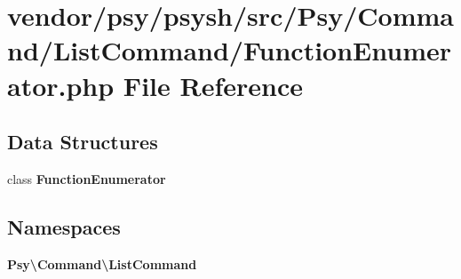 \section{vendor/psy/psysh/src/\+Psy/\+Command/\+List\+Command/\+Function\+Enumerator.php File Reference}
\label{_function_enumerator_8php}
\subsection*{Data Structures}
\begin{DoxyCompactItemize}
\item 
class {\bf Function\+Enumerator}
\end{DoxyCompactItemize}
\subsection*{Namespaces}
\begin{DoxyCompactItemize}
\item 
 {\bf Psy\textbackslash{}\+Command\textbackslash{}\+List\+Command}
\end{DoxyCompactItemize}
